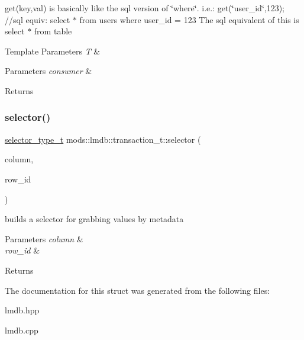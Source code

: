 get(key,val) is basically like the sql version of \char`\"{}where\char`\"{}. i.\+e.\+: get(\char`\"{}user\+\_\+id\char`\"{},123); //sql equiv\+: select $\ast$ from users where user\+\_\+id = 123 The sql equivalent of this is \textquotesingle{}select $\ast$ from table\textquotesingle{} 
\begin{DoxyTemplParams}{Template Parameters}
{\em T} & \\
\hline
\end{DoxyTemplParams}

\begin{DoxyParams}{Parameters}
{\em consumer} & \\
\hline
\end{DoxyParams}
\begin{DoxyReturn}{Returns}

\end{DoxyReturn}
\mbox{\label{structmods_1_1lmdb_1_1transaction__t_a3ad01fb11426f89327765dc0055d94a3}} 
\subsubsection{\texorpdfstring{selector()}{selector()}}
{\footnotesize\ttfamily \hyperlink{structmods_1_1lmdb_1_1__selector}{selector\+\_\+type\+\_\+t} mods\+::lmdb\+::transaction\+\_\+t\+::selector (\begin{DoxyParamCaption}\item[{const key\+\_\+type\+\_\+t \&}]{column,  }\item[{const uint64\+\_\+t \&}]{row\+\_\+id }\end{DoxyParamCaption})}



builds a selector for grabbing values by metadata 


\begin{DoxyParams}{Parameters}
{\em column} & \\
\hline
{\em row\+\_\+id} & \\
\hline
\end{DoxyParams}
\begin{DoxyReturn}{Returns}

\end{DoxyReturn}


The documentation for this struct was generated from the following files\+:\begin{DoxyCompactItemize}
\item 
lmdb.\+hpp\item 
lmdb.\+cpp\end{DoxyCompactItemize}
